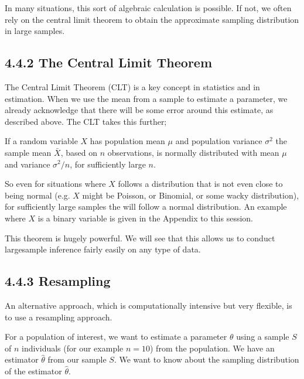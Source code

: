 \documentclass[letterpaper,10pt,english]{jupyterBook}
\begin{document}
\sphinxAtStartPar
In many situations, this sort of algebraic calculation is possible. If not, we often rely on the central limit theorem to obtain the approximate sampling distribution in large samples.


\subsection{4.4.2 The Central Limit Theorem}
\label{\detokenize{04.e. Population.and.samples:the-central-limit-theorem}}
\sphinxAtStartPar
The Central Limit Theorem (CLT) is a key concept in statistics and in estimation. When we use the mean from a sample to estimate a parameter, we already acknowledge that there will be some error around this estimate, as described above. The CLT takes this further;



\sphinxAtStartPar
If a random variable \(X\) has population mean \(\mu\) and population variance \(\sigma^2\) the sample mean \(\bar{X}\), based on \(n\) observations, is  normally distributed with mean \(\mu\) and variance \(\sigma^2/n\), for sufficiently large \(n\).



\sphinxAtStartPar
So even for situations where \(X\) follows a distribution that is not even close to being normal (e.g. \(X\) might be Poisson, or Binomial, or some wacky distribution), for sufficiently large samples the  will follow a normal distribution. An example where \(X\) is a binary variable is given in the Appendix to this session.

\sphinxAtStartPar
This theorem is hugely powerful. We will see that this allows us to conduct large\sphinxhyphen{}sample inference fairly easily on any type of data.


\subsection{4.4.3 Resampling}
\label{\detokenize{04.e. Population.and.samples:resampling}}
\sphinxAtStartPar
An alternative approach, which is computationally intensive but very flexible, is to use a resampling approach.

\sphinxAtStartPar
For a population of interest, we want to estimate a parameter \(\theta\) using a sample \(S\) of \(n\) individuals (for our example \(n=10\)) from the population. We have an estimator \(\hat{\theta}\) from our sample \(S\). We want to know about the sampling distribution of the estimator \(\hat{\theta}\).
\end{document}
